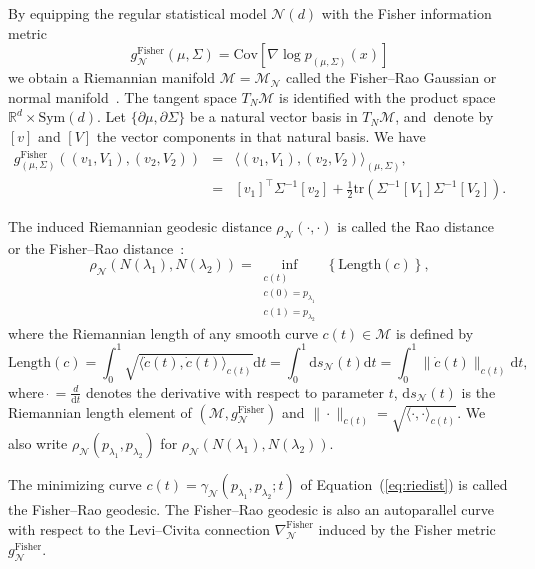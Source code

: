 \documentclass[entropy,article,accept,oneauthor,pdftex,entropy]{Definitions/mdpi}
\def\Sym{\mathrm{Sym}}
\def\calM{\mathcal{M}}
\def\Sym{\mathrm{Sym}}
\def\bbR{\mathbb{R}}
\def\Fisher{\mathrm{Fisher}}
\def\vectortwo#1#2{{\left[\begin{array}{l}#1 \cr #2\end{array}\right]}}
\def\tr{\mathrm{tr}}
\def\innerat#1#2#3{ {{\langle #2, #3\rangle}_{#1}} }
\def\calN{\mathcal{N}}
\def\Length{\mathrm{Length}}
\def\dt{\mathrm{d}t}
\def\ds{\mathrm{d}s}
\def\bbR{\mathbb{R}}
\def\Cov{\mathrm{Cov}}
\begin{document}
By equipping the regular statistical model $\calN(d)$ with the Fisher information metric  
$$
g^\Fisher_\calN(\mu,\Sigma)=\Cov[\nabla\log p_{(\mu,\Sigma)}(x)]
$$
we obtain a Riemannian manifold $\calM=\calM_{\calN}$ called the Fisher--Rao Gaussian or normal manifold~\cite{Skovgaard-1981,Skovgaard-1984}.
The tangent space $T_N\calM$ is identified with the product space $\bbR^d\times\Sym(d)$. 
Let $\{\partial\mu,\partial\Sigma\}$ be a natural vector basis in $T_N\calM$, and~denote by $[v]$ and $[V]$ the vector components in that  natural basis.
We have
\begin{eqnarray*}
g^\Fisher_{(\mu,\Sigma)}((v_1,V_1),(v_2,V_2)) &=& \innerat{(\mu,\Sigma)}{(v_1,V_1)}{(v_2,V_2)},\\
&=& [v_1]^\top\Sigma^{-1}[v_2]+\frac{1}{2}\tr\left(\Sigma^{-1}[V_1]\Sigma^{-1}[V_2]\right).
\end{eqnarray*}


The induced Riemannian geodesic distance $\rho_\calN(\cdot,\cdot)$   is called the Rao distance~\cite{AtkinsonRao-1981} or the Fisher--Rao distance~\cite{Rao-1945,chen2021upper}:
\begin{equation}\label{eq:riedist}
\rho_\calN(N(\lambda_1),N(\lambda_2))=\inf_{\substack{c(t)\\ c(0)=p_{\lambda_1}\\ c(1)=p_{\lambda_2}}}  \, \left\{\Length(c)\right\},
\end{equation}
where the Riemannian length of any smooth curve $c(t)\in\calM$ is defined by
\begin{equation}
\Length(c)=\int_0^1 \sqrt{\innerat{c(t)}{\dot c(t)}{\dot c(t)}} \dt = \int_0^1 {\ds_\calN(t)} \dt = \int_0^1 \|\dot c(t)\|_{c(t)}\dt,
\end{equation}
{where} %
 $\dot{\ }=\frac{d}{\dt}$ denotes the derivative with respect to parameter $t$, $\ds_\calN(t)$ is the Riemannian length element of $(\calM,g_\calN^\Fisher)$ and $\|\cdot\|_{c(t)}=\sqrt{\innerat{c(t)}{\cdot}{\cdot}}$.
We also write $\rho_\calN(p_{\lambda_1},p_{\lambda_2})$ for $\rho_\calN(N(\lambda_1),N(\lambda_2))$.

The minimizing curve $c(t)=\gamma_\calN(p_{\lambda_1},p_{\lambda_2};t)$ of Equation~(\ref{eq:riedist}) is called the Fisher--Rao geodesic.
The Fisher--Rao geodesic is also an autoparallel curve~\cite{calin2014geometric} with respect to the Levi–Civita connection $\nabla^\Fisher_\calN$ induced by the Fisher metric $g^\Fisher_\calN$.
 
\end{document}
